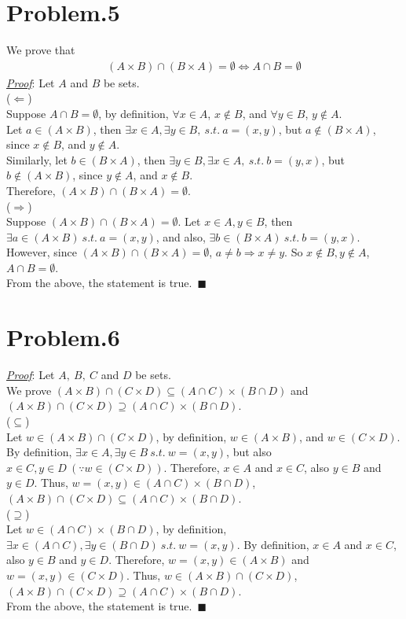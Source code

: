 \documentclass[12pt]{article}
\begin{document}
\section*{Problem.5}
We prove that 
\begin{gather*}
(A \times B) \cap (B \times A) = \emptyset \Leftrightarrow  A \cap B = \emptyset
\end{gather*}
\underline{\textit{Proof}}: Let $A$ and $B$ be sets.\\[1em]
($\Leftarrow$)\\[1em]
Suppose $A \cap B = \emptyset$, by definition, $\forall x \in A$, $x \notin B$, and $\forall y \in B$, $y \notin A$.\\
Let $a \in (A \times B)$, then $\exists x \in A, \exists y \in B,~ s.t.~ a = (x,y)$, but $a \notin (B \times A)$, since $x \notin B$, and $y \notin A$.\\ Similarly, let $b \in (B \times A)$, then $\exists y \in B, \exists x \in A,~ s.t.~ b = (y,x)$, but $b \notin (A \times B)$, since $y \notin A$, and $x \notin B$.\\
Therefore, $(A \times B) \cap (B \times A) = \emptyset$.\\[1em]
($\Rightarrow$)\\[1em]
Suppose $(A \times B) \cap (B \times A) = \emptyset$. Let $x \in A, y \in B$, then $\exists a \in (A \times B) ~s.t.~ a = (x,y)$, and also, $\exists b \in (B \times A) ~s.t.~ b = (y, x)$. However, since $(A \times B) \cap (B \times A) = \emptyset$, $a \neq b \Rightarrow x \neq y$. So $x \notin B, y \notin A$, $A \cap B = \emptyset$.\\[1em]
From the above, the statement is true.~$\blacksquare$

\section*{Problem.6}
\underline{\textit{Proof}}: Let $A,~B,~C$ and $D$ be sets.\\[1em]
We prove $(A \times B) \cap (C \times D) \subseteq (A \cap C) \times (B \cap D)$ and $(A \times B) \cap (C \times D) \supseteq (A \cap C) \times (B \cap D)$.\\[1em]
($\subseteq$)\\[1em]
Let $w \in (A \times B) \cap (C \times D)$, by definition, $w \in (A \times B)$, and $w \in (C \times D)$. By definition, $\exists x \in A, \exists y \in B ~s.t.~ w = (x,y)$, but also $x \in C, y \in D ~(\because w \in (C \times D))$. Therefore, $x \in A$ and $x \in C$, also $y \in B$ and $y \in D$. Thus, $w = (x, y) \in (A \cap C) \times (B \cap D)$, $(A \times B) \cap (C \times D) \subseteq (A \cap C) \times (B \cap D)$.\\[1em]
($\supseteq$)\\[1em]
Let $w \in (A \cap C) \times (B \cap D)$, by definition, $\exists x \in (A \cap C), \exists y \in (B \cap D) ~s.t.~ w = (x,y)$. By definition, $x \in A$ and $x \in C$, also $y \in B$ and $y \in D$. Therefore, $w = (x, y) \in (A \times B)$ and $w = (x, y) \in (C \times D)$. Thus, $w \in (A \times B) \cap (C \times D)$, $(A \times B) \cap (C \times D) \supseteq (A \cap C) \times (B \cap D)$.\\[1em]
From the above, the statement is true.~$\blacksquare$
\end{document}
